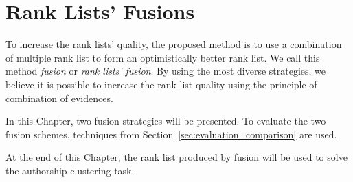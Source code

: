 \chapter{Rank Lists' Fusions \label{sec:fusions}}

To increase the rank lists' quality, the proposed method is to use a combination of multiple rank list to form an optimistically better rank list.
We call this method \textit{fusion} or \textit{rank lists' fusion}.
By using the most diverse strategies, we believe it is possible to increase the rank list quality using the principle of combination of evidences.

In this Chapter, two fusion strategies will be presented.
To evaluate the two fusion schemes, techniques from Section~\ref{sec:evaluation_comparison} are used.

At the end of this Chapter, the rank list produced by fusion will be used to solve the authorship clustering task.






